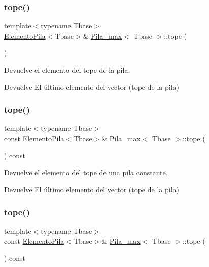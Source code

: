 \subsubsection{\texorpdfstring{tope()}{tope()}\hspace{0.1cm}{\footnotesize\ttfamily [2/4]}}
{\footnotesize\ttfamily template$<$typename Tbase$>$ \\
\hyperlink{structElementoPila}{Elemento\+Pila}$<$Tbase$>$\& \hyperlink{classPila__max}{Pila\+\_\+max}$<$ Tbase $>$\+::tope (\begin{DoxyParamCaption}{ }\end{DoxyParamCaption})}



Devuelve el elemento del tope de la pila. 

\begin{DoxyReturn}{Devuelve}
El último elemento del vector (tope de la pila) 
\end{DoxyReturn}
\mbox{\label{classPila__max_a675ce3ae969e6a9050b0b8289b9d4934}} 
\subsubsection{\texorpdfstring{tope()}{tope()}\hspace{0.1cm}{\footnotesize\ttfamily [3/4]}}
{\footnotesize\ttfamily template$<$typename Tbase$>$ \\
const \hyperlink{structElementoPila}{Elemento\+Pila}$<$Tbase$>$\& \hyperlink{classPila__max}{Pila\+\_\+max}$<$ Tbase $>$\+::tope (\begin{DoxyParamCaption}{ }\end{DoxyParamCaption}) const}



Devuelve el elemento del tope de una pila constante. 

\begin{DoxyReturn}{Devuelve}
El último elemento del vector (tope de la pila) 
\end{DoxyReturn}
\mbox{\label{classPila__max_a675ce3ae969e6a9050b0b8289b9d4934}} 
\subsubsection{\texorpdfstring{tope()}{tope()}\hspace{0.1cm}{\footnotesize\ttfamily [4/4]}}
{\footnotesize\ttfamily template$<$typename Tbase$>$ \\
const \hyperlink{structElementoPila}{Elemento\+Pila}$<$Tbase$>$\& \hyperlink{classPila__max}{Pila\+\_\+max}$<$ Tbase $>$\+::tope (\begin{DoxyParamCaption}{ }\end{DoxyParamCaption}) const}



